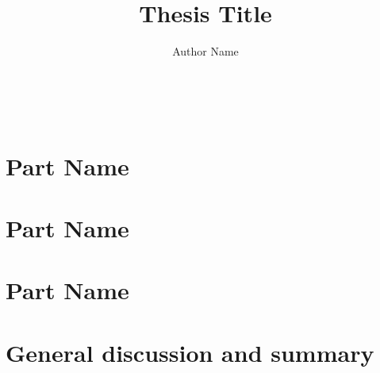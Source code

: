 \documentclass[twoside]{RadboudReport}
\title{Thesis Title}
\author{Author Name}
\begin{document}
\headerpage
\infopage
\thesistitlepage
\promotorpage
\cleardoublepage

\setcounter{tocdepth}{0}
\renewcommand{\contentsname}{Table of Contents}
\tableofcontents
\thispagestyle{empty}

\clearpage
\thispagestyle{empty}
~
\cleardoublepage



\part{Part Name}\label{part:part1}
\cleardoublepage



\part{Part Name}\label{part:part2}
\cleardoublepage




\part{Part Name}\label{part:part3}
\cleardoublepage



\part{General discussion and summary}\label{part:summary}
\cleardoublepage





\end{document}
